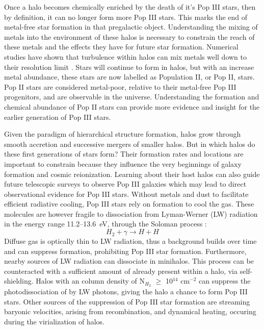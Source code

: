 \documentclass[a4paper,fleqn,usenatbib]{mnras}
\begin{document}
Once a halo becomes chemically enriched by the death of it's Pop III stars, then by definition, it can no longer form more Pop III stars. This marks the end of metal-free star formation in that pregalactic object. Understanding the mixing of metals into the environment of these halos is necessary to constrain the reach of these metals and the effects they have for future star formation. Numerical studies have shown that turbulence within halos can mix metals well down to their resolution limit \citep[][and more]{Wise08_Gal, Greif10}. Stars will continue to form in halos, but with an increase metal abundance, these stars are now labelled as Population II, or Pop II, stars. Pop II stars are considered metal-poor, relative to their metal-free Pop III progenitors, and are observable in the universe. Understanding the formation and chemical abundance of Pop II stars can provide more evidence and insight for the earlier generation of Pop III stars.

Given the paradigm of hierarchical structure formation, halos grow through smooth accretion and successive mergers of smaller halos. But in which halos do these first generations of stars form? Their formation rates and locations are important to constrain because they influence the very beginnings of galaxy formation and cosmic reionization. Learning about their host halos can also guide future telescopic surveys to observe Pop III galaxies which may lead to direct observational evidence for Pop III stars.
Without metals and dust to facilitate efficient radiative cooling, Pop III stars rely on \hh{} formation to cool the gas. These molecules are however fragile to dissociation from Lyman-Werner (LW) radiation in the energy range 11.2--13.6~eV, through the Soloman process :
\begin{equation}
	H_{2} + \gamma \rightarrow  H + H
\end{equation}
Diffuse gas is optically thin to LW radiation, thus a background builds over time and can suppress \hh{} formation, prohibiting Pop III star formation. Furthermore, nearby sources of LW radiation can dissociate \hh{} in minihalos. This process can be counteracted with a sufficient amount of \hh{} already present within a halo, via \hh{} self-shielding. Halos with an \hh{} column density of N$_{H_{2}}$ $\geq$ 10$^{14}$ cm$^{-2}$ can suppress the photodissociation of \hh{} by LW photons, giving the halo a chance to form Pop III stars. Other sources of the suppression of Pop III star formation are streaming baryonic velocities, arising from recombination, and dynamical heating, occuring during the virialization of halos. 
\end{document}
